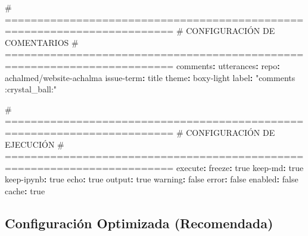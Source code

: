 \documentclass[
  doc,
  floatsintext,
  longtable,
  a4paper,
  nolmodern,
  notxfonts,
  notimes,
  12pt,
  colorlinks=true,linkcolor=blue,citecolor=blue,urlcolor=blue]{apa7}
\newenvironment{Shaded}{\begin{snugshade}}{\end{snugshade}}
\newcommand{\AttributeTok}[1]{\textcolor[rgb]{0.40,0.45,0.13}{#1}}
\newcommand{\CharTok}[1]{\textcolor[rgb]{0.13,0.47,0.30}{#1}}
\newcommand{\CommentTok}[1]{\textcolor[rgb]{0.37,0.37,0.37}{#1}}
\newcommand{\FunctionTok}[1]{\textcolor[rgb]{0.28,0.35,0.67}{#1}}
\newcommand{\KeywordTok}[1]{\textcolor[rgb]{0.00,0.23,0.31}{\textbf{#1}}}
\newcommand{\StringTok}[1]{\textcolor[rgb]{0.13,0.47,0.30}{#1}}
\begin{document}
\begin{Shaded}
\begin{Highlighting}[]
\CommentTok{\# ========================================================================}
\CommentTok{\# CONFIGURACIÓN DE COMENTARIOS}
\CommentTok{\# ========================================================================}
\FunctionTok{comments}\KeywordTok{:}
\AttributeTok{  }\FunctionTok{utterances}\KeywordTok{:}
\AttributeTok{    }\FunctionTok{repo}\KeywordTok{:}\AttributeTok{ achalmed/website{-}achalma}
\AttributeTok{    }\FunctionTok{issue{-}term}\KeywordTok{:}\AttributeTok{ title}
\AttributeTok{    }\FunctionTok{theme}\KeywordTok{:}\AttributeTok{ boxy{-}light}
\AttributeTok{    }\FunctionTok{label}\KeywordTok{:}\AttributeTok{ }\StringTok{"comments :crystal\_ball:"}

\CommentTok{\# ========================================================================}
\CommentTok{\# CONFIGURACIÓN DE EJECUCIÓN}
\CommentTok{\# ========================================================================}
\FunctionTok{execute}\KeywordTok{:}
\AttributeTok{  }\FunctionTok{freeze}\KeywordTok{:}\AttributeTok{ }\CharTok{true}
\AttributeTok{  }\FunctionTok{keep{-}md}\KeywordTok{:}\AttributeTok{ }\CharTok{true}
\AttributeTok{  }\FunctionTok{keep{-}ipynb}\KeywordTok{:}\AttributeTok{ }\CharTok{true}
\AttributeTok{  }\FunctionTok{echo}\KeywordTok{:}\AttributeTok{ }\CharTok{true}
\AttributeTok{  }\FunctionTok{output}\KeywordTok{:}\AttributeTok{ }\CharTok{true}
\AttributeTok{  }\FunctionTok{warning}\KeywordTok{:}\AttributeTok{ }\CharTok{false}
\AttributeTok{  }\FunctionTok{error}\KeywordTok{:}\AttributeTok{ }\CharTok{false}
\AttributeTok{  }\FunctionTok{enabled}\KeywordTok{:}\AttributeTok{ }\CharTok{false}
\AttributeTok{  }\FunctionTok{cache}\KeywordTok{:}\AttributeTok{ }\CharTok{true}
\end{Highlighting}
\end{Shaded}

\subsection{Configuración Optimizada
(Recomendada)}\label{configuraciuxf3n-optimizada-recomendada}
\end{document}

